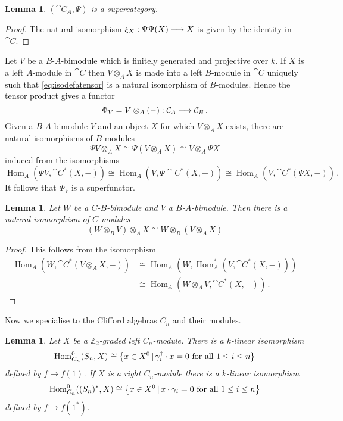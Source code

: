 \documentclass[english,letter paper,12pt,leqno]{article}
\newtheorem{lemma}[theorem]{Lemma}
\theoremstyle{example}
\numberwithin{equation}{section}
\def\Hom{\operatorname{Hom}}
\begin{document}
\begin{lemma} $(\cat{C}_A, \Psi)$ is a supercategory.
\end{lemma}
\begin{proof}
The natural isomorphism $\xi_X: \Psi \Psi (X) \longrightarrow X$ is given by the identity in $\cat{C}$.
\end{proof}

Let $V$ be a $B$-$A$-bimodule which is finitely generated and projective over $k$. If $X$ is a left $A$-module in $\cat{C}$ then $V \otimes_A X$ is made into a left $B$-module in $\cat{C}$ uniquely such that \eqref{eq:isodefatensor} is a natural isomorphism of $B$-modules. Hence the tensor product gives a functor
\[
\Phi_V = V \otimes_A (-): \mathcal{C}_A \longrightarrow \mathcal{C}_B\,.
\]
Given a $B$-$A$-bimodule $V$ and an object $X$ for which $V \otimes_A X$ exists, there are natural isomorphisms of $B$-modules
\[
\Psi V \otimes_A X \cong \Psi(V \otimes_A X) \cong V \otimes_A \Psi X
\]
induced from the isomorphisms
\[
\Hom_A( \Psi V, \cat{C}^*(X, -)) \cong \Hom_A( V, \Psi \cat{C}^*(X, -) ) \cong \Hom_A( V, \cat{C}^*(\Psi X, -))\,.
\]
It follows that $\Phi_V$ is a superfunctor.

\begin{lemma}\label{lemma:assoctensor} Let $W$ be a $C$-$B$-bimodule and $V$ a $B$-$A$-bimodule. Then there is a natural isomorphism of $C$-modules
\[
(W \otimes_B V) \otimes_A X \cong W \otimes_B ( V \otimes_A X )
\]
\end{lemma}
\begin{proof}
This follows from the isomorphism
\begin{align*}
\Hom_A(W, \cat{C}^*(V \otimes_A X, -)) &\cong \Hom_A( W, \Hom_A^*(V, \cat{C}^*(X, -)))\\
&\cong \Hom_A(W \otimes_A V, \cat{C}^*(X, -))\,.
\end{align*}
\end{proof}

Now we specialise to the Clifford algebras $C_n$ and their modules.

\begin{lemma}\label{lemma:simplehom} Let $X$ be a $\mathbb{Z}_2$-graded left $C_n$-module. There is a $k$-linear isomorphism
\[
\Hom_{C_n}^0( S_n, X ) \cong \big\{ x \in X^0 \l \gamma_i^\dagger \cdot x = 0 \text{ for all } 1 \le i \le n \big\}
\]
defined by $f \mapsto f(1)$. If $X$ is a right $C_n$-module there is a $k$-linear isomorphism
\[
\Hom^0_{C_n}( (S_n)^*, X ) \cong \big\{ x \in X^0 \l x \cdot \gamma_i = 0 \text{ for all } 1 \le i \le n \big\}
\]
defined by $f \mapsto f(1^*)$.
\end{lemma}
\end{document}

